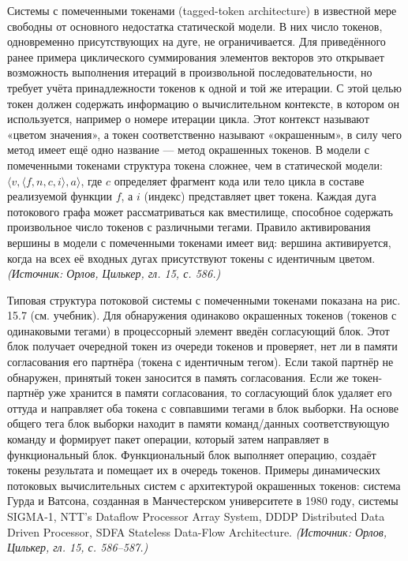 \documentclass[a4paper,12pt]{article}
\begin{document}
Системы с помеченными токенами (tagged-token architecture) в известной мере свободны от основного недостатка статической модели. В них число токенов, одновременно присутствующих на дуге, не ограничивается. Для приведённого ранее примера циклического суммирования элементов векторов это открывает возможность выполнения итераций в произвольной последовательности, но требует учёта принадлежности токенов к одной и той же итерации. С этой целью токен должен содержать информацию о вычислительном контексте, в котором он используется, например о номере итерации цикла. Этот контекст называют «цветом значения», а токен соответственно называют «окрашенным», в силу чего метод имеет ещё одно название — метод окрашенных токенов. В модели с помеченными токенами структура токена сложнее, чем в статической модели: \(\langle v, \langle f, n, c, i \rangle, a \rangle\), где \(c\) определяет фрагмент кода или тело цикла в составе реализуемой функции \(f\), а \(i\) (индекс) представляет цвет токена. Каждая дуга потокового графа может рассматриваться как вместилище, способное содержать произвольное число токенов с различными тегами. Правило активирования вершины в модели с помеченными токенами имеет вид: вершина активируется, когда на всех её входных дугах присутствуют токены с идентичным цветом.
\textit{(Источник: Орлов, Цилькер, гл. 15, с. 586.)}

Типовая структура потоковой системы с помеченными токенами показана на рис. 15.7 (см. учебник). Для обнаружения одинаково окрашенных токенов (токенов с одинаковыми тегами) в процессорный элемент введён согласующий блок. Этот блок получает очередной токен из очереди токенов и проверяет, нет ли в памяти согласования его партнёра (токена с идентичным тегом). Если такой партнёр не обнаружен, принятый токен заносится в память согласования. Если же токен-партнёр уже хранится в памяти согласования, то согласующий блок удаляет его оттуда и направляет оба токена с совпавшими тегами в блок выборки. На основе общего тега блок выборки находит в памяти команд/данных соответствующую команду и формирует пакет операции, который затем направляет в функциональный блок. Функциональный блок выполняет операцию, создаёт токены результата и помещает их в очередь токенов. Примеры динамических потоковых вычислительных систем с архитектурой окрашенных токенов: система Гурда и Ватсона, созданная в Манчестерском университете в 1980 году, системы SIGMA-1, NTT’s Dataflow Processor Array System, DDDP Distributed Data Driven Processor, SDFA Stateless Data-Flow Architecture.
\textit{(Источник: Орлов, Цилькер, гл. 15, с. 586--587.)}
\end{document}
